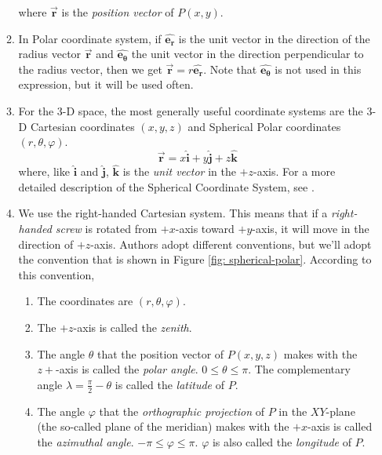 \documentclass[12pt,a4paper]{book}
\newcommand{\vect}[1]{\pmb{\vec{#1}}}
\newcommand{\uvec}[1]{\pmb{\hat{#1}}}
\begin{document}
\begin{enumerate}
\begin{enumerate}
\begin{equation}
                \end{equation}
                where $\vect{r}$ is the \emph{position vector} of $P(x, y)$.
            \item \label{item: 2-d-polar-vector} 
                In Polar coordinate system, if $\uvec{e_r}$ is the unit vector in the direction of the radius vector $\vect{r}$ and $\uvec{e_\theta}$ the unit vector in the direction perpendicular to the radius vector, then we get $\vect{r} = r\uvec{e_r}$. Note that $\uvec{e_\theta}$ is not used in this expression, but it will be used often.
            \item For the 3-D space, the most generally useful coordinate systems are the 3-D Cartesian coordinates $(x, y, z)$ and Spherical Polar coordinates $(r, \theta, \varphi)$. 
                \begin{equation}
                    \label{eqn: 3d-vector-cartesian}
                    \vect{r} = x\uvec{i} + y\uvec{j} + z\uvec{k}
                \end{equation}
                where, like $\uvec{i}$ and $\uvec{j}$, $\uvec{k}$ is the \emph{unit vector} in the $+z$-axis.
                For a more detailed description of the Spherical Coordinate System, see \cite{polar}.
            \item We use the right-handed Cartesian system. This means that if a \emph{right-handed screw} is rotated from $+x$-axis toward $+y$-axis, it will move in the direction of $+z$-axis. Authors adopt different conventions, but we'll adopt the convention that is shown in Figure \ref{fig: spherical-polar}. According to this convention,
                \begin{enumerate}
                    \item The coordinates are $(r, \theta, \varphi)$.
                    \item The $+z$-axis is called the \emph{zenith}.
                    \item The angle $\theta$ that the position vector of $P(x, y, z)$ makes with the $z+$-axis is called the \emph{polar angle}. $0\leq\theta\leq\pi$. The complementary angle $\lambda = \frac{\pi}{2}-\theta$ is called the \emph{latitude} of $P$.
                    \item The angle $\varphi$ that the \emph{orthographic projection} of $P$ in the $XY$-plane (the so-called plane of the meridian) makes with the $+x$-axis is called the \emph{azimuthal angle}. $-\pi\leq\varphi\leq\pi$. $\varphi$ is also called the \emph{longitude} of $P$.
                \end{enumerate}

\end{enumerate}
\end{enumerate}
\end{document}
